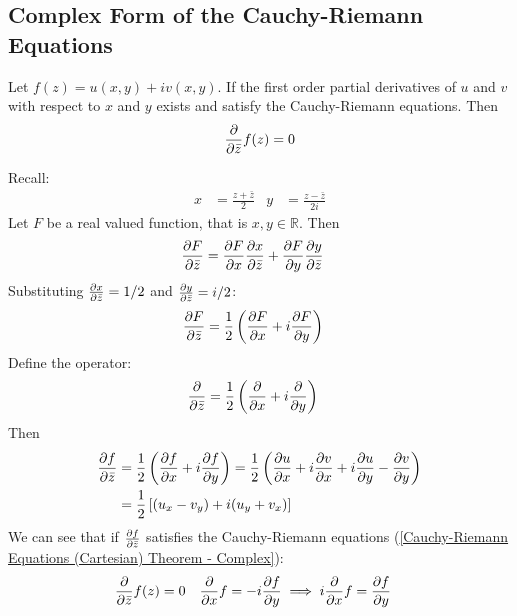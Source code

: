 \documentclass[12pt, english]{book}
\makeatletter
\renewenvironment{proof}[1][\proofname]{\par
	\pushQED{\qed}%
	\normalfont \topsep6\p@\@plus6\p@\relax
	\list{}{%
		\settowidth{\leftmargin}{\itshape\proofname:\hskip\labelsep}%
		\setlength{\labelwidth}{0pt}%
		\setlength{\itemindent}{-\leftmargin}%
		}%
	\item[\hskip\labelsep\itshape#1\@addpunct{:}]\ignorespaces
	}{\popQED\endlist\@endpefalse}
\makeatother
\begin{document}
	\subsection{Complex Form of the Cauchy-Riemann Equations} 
	\label{Cauchy-Riemann Equations (Complex) Subsection - Complex}
	
	\begin{theorem}
		\label{Cauchy-Riemann Equations (Complex) Theorem - Complex}
		Let \(f(z) = u(x,y) + iv(x,y)\). If the first order partial derivatives of \(u\) and \(v\) with respect to \(x\) and \(y\) exists and satisfy the Cauchy-Riemann equations. Then
		\[\pdv{\bar{z}} f(z) = 0\]
	\end{theorem}
	\begin{proof}{\color{Grey}
		Recall:
		\begin{align*}
			x &= \frac{z + \bar{z}}{2} & y &= \frac{z - \bar{z}}{2i}
		\end{align*}
		Let \(F\) be a real valued function, that is \(x, y \in \mathbb{R}\). Then
		\begin{align*}
			\pdv{F}{\bar{z}} &= \pdv{F}{x} \pdv{x}{\bar{z}} + \pdv{F}{y} \pdv{y}{\bar{z}}
		\end{align*}
		Substituting \(\pdv{x}{\bar{z}} = 1/2\) and \(\pdv{y}{\bar{z}} = i/2\):
		\begin{align*}
			\pdv{F}{\bar{z}} &= \frac{1}{2} \left(\pdv{F}{x} + i \pdv{F}{y} \right)
		\end{align*}
		Define the operator:
		\begin{align*}
			\pdv{\bar{z}} &= \frac{1}{2} \left(\pdv{x} + i \pdv{y} \right)
		\end{align*}
		Then 
		\begin{align*}
			\pdv{f}{\bar{z}} &= \frac{1}{2} \left(\pdv{f}{x} + i \pdv{f}{y} \right)
				= \frac{1}{2} \left(\pdv{u}{x} + i \pdv{v}{x} + i\pdv{u}{y} -  \pdv{v}{y}  \right) \\
				&= \frac{1}{2} \left[ (u_x - v_y) + i (u_y + v_x)\right]
		\end{align*}
		We can see that if \(\pdv{f}{\bar{z}}\) satisfies the Cauchy-Riemann equations (\cref{Cauchy-Riemann Equations (Cartesian) Theorem - Complex}):
		\begin{align*}
			\pdv{\bar{z}} f(z) &= 0 & \pdv{x}f &= -i \pdv{f}{y} \implies i\pdv{x}f = \pdv{f}{y} 
		\end{align*}
		}
	\end{proof}
	
\end{document}
